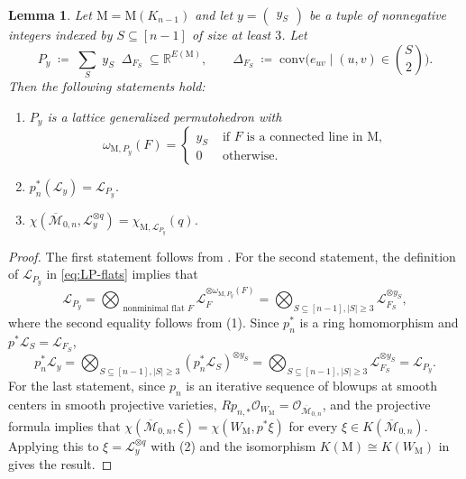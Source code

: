 \documentclass[11pt,a4paper,reqno]{amsart}
\theoremstyle{results}
\newtheorem{lemma}[thm]{Lemma}
\theoremstyle{definitions}
\def\R{\mathbb{R}}
\def\calO{\mathcal{O}}
\newcommand{\abs}[1]{\left\lvert#1\right\rvert}
\newcommand{\M}{\mathrm{M}}
\newcommand{\cL}{\mathcal{L}}
\newcommand{\Mbar}{\overline{\mathcal M}}
\begin{document}
\begin{lemma}
\label{lem:compute-EC-as-pullback}
Let $\M = \M(K_{n-1})$ and let $y = \begin{pmatrix} y_S \end{pmatrix}$ be a tuple of nonnegative integers indexed by $S \subseteq [n-1]$ of size at least $3$. 
Let 
\[
P_y \;\coloneqq\; \sum_{S} \;y_S\; \; \Delta_{F_S}\; \subseteq \R^{E(\M)}, \qquad \Delta_{F_S} \; \coloneqq \;\textrm{conv}\Big(e_{uv} \mid (u, v) \in \binom{S}{2}\Big). 
\]
Then the following statements hold: 
\begin{enumerate}[leftmargin=20pt]
  \item $P_y$ is a lattice generalized permutohedron with 
  \[
  \omega_{\M, P_y}(F) = \begin{cases}
    y_S & \textrm{ if $F$ is a connected line in $\M$}, \\
    0 & \textrm{ otherwise}. 
  \end{cases}
  \]
  \item $p_n^{\ast}(\cL_{y}) = \cL_{P_y}$. 
  \item $\chi(\Mbar_{0, n}, \cL_y^{\otimes q}) = \chi_{\M, \cL_{P_y}}(q)$. 
\end{enumerate}
\end{lemma}

\begin{proof}
  The first statement follows from . 
  For the second statement, the definition of $\cL_{P_y}$ in \eqref{eq:LP-flats} implies that 
  \[
  \cL_{P_y} = \bigotimes_{\textrm{ nonminimal flat } F} \cL_F^{\otimes \omega_{\M, P_y}(F)} = \bigotimes_{S \subseteq [n-1], \abs{S} \geqslant 3} \cL_{F_S}^{\otimes y_S}, 
  \] where the second equality follows from (1). 
  Since $p_n^{\ast}$ is a ring homomorphism and $p^{\ast}\cL_S = \cL_{F_S}$, 
  \[
  p_n^{\ast}\cL_y = \bigotimes_{S \subseteq [n-1], \abs{S} \geqslant 3} (p_n^{\ast} \cL_S)^{\otimes y_S} = \bigotimes_{S \subseteq [n-1], \abs{S} \geqslant 3} \cL_{F_S}^{\otimes y_S} = \cL_{P_y}. 
  \] 
  For the last statement, since $p_n$ is an iterative sequence of blowups at smooth centers in smooth projective varieties, $R p_{n, \ast} \calO_{W_{\M}} = \calO_{\Mbar_{0, n}}$, 
  and the projective formula implies that $\chi(\Mbar_{0, n}, \xi) = \chi(W_{\M}, p^{\ast} \xi)$ for every $\xi \in K(\Mbar_{0, n})$. Applying this to $\xi = \cL_{y}^{\otimes q}$ with (2) and the isomorphism $K(\M) \cong K(W_{\M})$ in \cite[Proposition 1.13]{larson2024k} gives the result. 
\end{proof}
\end{document}
